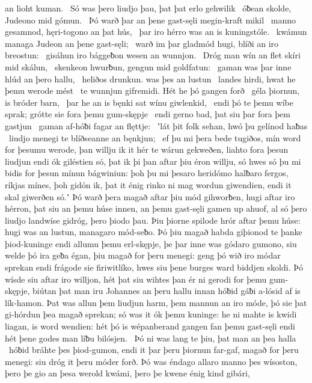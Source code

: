 an lioht kuman. \hld\ Só was þero liudjo þau,
þat þat erlo gehwilik \hld\ óƀean skolde,
Judeono mid gómun. \hld\ Þó warð þar an þene gast-sęli
megin-kraft mikil \hld\ manno gesamnod,
hęri-togono an þat hús, \hld\ þar iro hérro was
an is kuningstóle. \hld\ kwámun managa
Judeon an þene gast-sęli; \hld\ warð im þar gladmód hugi,
blíði an iro breostun: \hld\ gisáhun iro bággeƀon
wesen an wunnjon. \hld\ Dróg man wín an flet
skíri mid skálun, \hld\ skenkeon hwurƀun,
gengun mid goldfatun: \hld\ gaman was þar inne
hlúd an þero hallu, \hld\ heliðos drunkun.
was þes an lustun \hld\ landes hirdi,
hwat he þemu werode mést \hld\ te wunnjun gifremidi.
Hét he þó gangen forð \hld\ géla þiornun,
is bróder barn, \hld\ þar he an is bęnki sat
wínu giwlenkid, \hld\ endi þó te þemu wíbe sprak;
grótte sie fora þemu gum-skępje \hld\ endi gerno bad,
þat siu þar fora þem gastjun \hld\ gaman af-hóƀi
fagar an flęttje: \hld\ ʽlát þit folk sehan,
hwó þu gelínod haƀas \hld\ liudjo menegi
te blíðseanne an bęnkjun; \hld\ ef þu mi þera bede tugiðos,
mín word for þesumu werode, þan willju ik it hér te wárun gekweðen,
liahto fora þesun liudjun endi ók giléstien só,
þat ik þi þan aftar þiu éron willju,
só hwes só þu mi bidis for þesun mínun bágwiniun:
þoh þu mi þesaro heridómo halƀaro fergos,
ríkjas mínes, þoh gidón ik, þat it énig rinko ni mag
wordun giwendien, endi it skal giwerðen só.ʼ
Þó warð þera magað aftar þiu mód gihworƀen,
hugi aftar iro hérron, þat siu an þemu húse innen,
an þemu gast-sęli gamen up ahuof,
al só þero liudjo landwíse gidróg,
þero þiodo þau. Þiu þiorne spilode
hrór aftar þemu húse: hugi was an lustun,
managaro mód-seƀo. Þó þiu magað habda
giþionod te þanke þiod-kuninge
endi allumu þemu erl-skępje, þe þar inne was
gódaro gumono, siu welde þó ira geƀa égan,
þiu magað for þeru menegi: geng þó wið iro módar sprekan
endi frágode sie firiwitlíko,
hwes siu þene burges ward biddjen skoldi.
Þó wísde siu aftar iro willjon, hét þat siu wihtes þan ér
ni gerodi for þemu gum-skępje, biútan þat man iru Johannes
an þeru hallu innan hóƀid gáƀi
a-lósid af is lík-hamon. Þat was allun þem liudjun harm,
þem mannun an iro móde, þó sie þat gi-hórdun þea magað sprekan;
só was it ók þemu kuninge: he ni mahte is kwidi liagan,
is word wendien: hét þó is wépanberand
gangen fan þemu gast-sęli endi hét þene godes man
líƀu bilósjen. \hld\ Þó ni was lang te þiu,
þat man an þea halla \hld\ hóƀid bráhte
þes þiod-gumon, endi it þar þeru þiornun far-gaf,
magað for þeru menegi: siu dróg it þeru móder forð.
Þó was éndago allaro manno
þes wísoston, þero þe gio an þesa werold kwámi,
þero þe kwene énig kind gibári,

